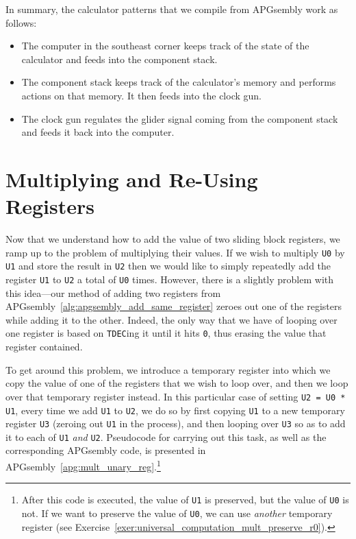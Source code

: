 In summary, the calculator patterns that we compile from APGsembly work as follows:\smallskip

\begin{itemize}
	\item The computer in the southeast corner keeps track of the state of the calculator and feeds into the component stack.\smallskip
	
	\item The component stack keeps track of the calculator's memory and performs actions on that memory. It then feeds into the clock gun.\smallskip
	
	\item The clock gun regulates the glider signal coming from the component stack and feeds it back into the computer.
\end{itemize}


\section{Multiplying and Re-Using Registers}\label{sec:multiply_two_registers}

Now that we understand how to add the value of two sliding block registers, we ramp up to the problem of multiplying their values. If we wish to multiply \texttt{U0} by \texttt{U1} and store the result in \texttt{U2} then we would like to simply repeatedly add the register \texttt{U1} to \texttt{U2} a total of \texttt{U0} times. However, there is a slightly problem with this idea---our method of adding two registers from APGsembly~\ref{alg:apgsembly_add_same_register} zeroes out one of the registers while adding it to the other. Indeed, the only way that we have of looping over one register is based on \texttt{TDEC}ing it until it hits \texttt{0}, thus erasing the value that register contained.

To get around this problem, we introduce a temporary register into which we copy the value of one of the registers that we wish to loop over, and then we loop over that temporary register instead. In this particular case of setting \texttt{U2 = U0 * U1}, every time we add \texttt{U1} to \texttt{U2}, we do so by first copying \texttt{U1} to a new temporary register \texttt{U3} (zeroing out \texttt{U1} in the process), and then looping over \texttt{U3} so as to add it to each of \texttt{U1} \emph{and} \texttt{U2}. Pseudocode for carrying out this task, as well as the corresponding APGsembly code, is presented in APGsembly~\ref{apg:mult_unary_reg}.\footnote{After this code is executed, the value of \texttt{U1} is preserved, but the value of \texttt{U0} is not. If we want to preserve the value of \texttt{U0}, we can use \emph{another} temporary register (see Exercise~\ref{exer:universal_computation_mult_preserve_r0}).}

